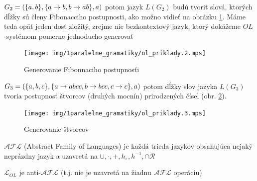 \begin{priklad}
    $G_{2}=(\{a,b\},\{a\rightarrow b,b\rightarrow ab\},a)$ potom jazyk $L(G_{2})$ budú
    tvoriť slová, ktorých dĺžky sú členy Fibonacciho postupnosti, ako
    možno vidieť na obrázku \ref{img:ol_priklad_2}. Máme teda
    opäť jeden dosť zložitý, zrejme nie bezkontextový jazyk,
    ktorý dokážeme $OL$-systémom pomerne jednoducho generovať
\end{priklad}

\begin{figure}[htp]
    \centering
    \texttt{[image: img/1paralelne\_gramatiky/ol\_priklady.2.mps]}
    \caption{Generovanie Fibonnaciho postupnosťi}
    \label{img:ol_priklad_2}
\end{figure}

\begin{priklad}
    $G_{3}=(\{a,b,c\},\{a\rightarrow abcc,b\rightarrow bcc,c\rightarrow c\},a)$ potom dĺžky
    slov jazyka $L(G_{3})$ tvoria postupnosť štvorcov (druhých mocnín)
    prirodzených čísel (obr. \ref{img:ol_priklad_3}).
\end{priklad}

\begin{figure}[htp]
    \centering
    \texttt{[image: img/1paralelne\_gramatiky/ol\_priklady.3.mps]}
    \caption{Generovanie štvorcov}
    \label{img:ol_priklad_3}
\end{figure}

\begin{definicia}
    $\mathcal{AFL}$ (Abstract Family of Languages) je každá trieda
    jazykov obsahujúca nejaký neprázdny jazyk a uzavretá na
    $\cup,\cdot,+,h_{\varepsilon},h^{-1},\cap\mathcal{R}$
\end{definicia}

\begin{veta}
    $\mathcal{L}_{OL}$ je anti-$\mathcal{AFL}$ (t.j. nie je uzavretá
    na žiadnu $\mathcal{AFL}$ operáciu)
\end{veta}

